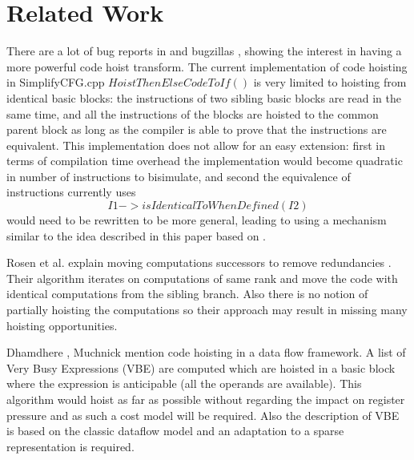 \documentclass{sig-alternate}
\begin{document}
\section{Related Work}

There are a lot of bug reports in \GCC{} and \LLVM{} bugzillas
\cite{GCCCodeHoistingBugs,LLVMCodeHoistingBugs}, showing the interest in having
a more powerful code hoist transform.  The current \LLVM{} implementation of code
hoisting in SimplifyCFG.cpp $HoistThenElseCodeToIf()$ is very limited to
hoisting from identical basic blocks: the instructions of two sibling basic
blocks are read in the same time, and all the instructions of the blocks are
hoisted to the common parent block as long as the compiler is able to prove that
the instructions are equivalent.  This implementation does not allow for an easy
extension: first in terms of compilation time overhead the implementation would
become quadratic in number of instructions to bisimulate, and second the
equivalence of instructions currently uses $$I1->isIdenticalToWhenDefined(I2)$$
would need to be rewritten to be more general, leading to using a mechanism
similar to the idea described in this paper based on \GVN{}.

Rosen et al. explain moving computations successors to remove redundancies
\cite{rosen1988global}. Their algorithm iterates on computations of same rank
and move the code with identical computations from the sibling branch. Also
there is no notion of partially hoisting the computations so their approach may
result in missing many hoisting opportunities.

Dhamdhere \cite{dhamdhere1988fast}, Muchnick \cite{steven1997advanced} mention
code hoisting in a data flow framework. A list of Very Busy Expressions (VBE)
are computed which are hoisted in a basic block where the expression is
anticipable (all the operands are available). This algorithm would hoist as far
as possible without regarding the impact on register pressure and as such a cost
model will be required.  Also the description of VBE is based on the classic
dataflow model and an adaptation to a sparse \SSA{} representation is required.
\end{document}
